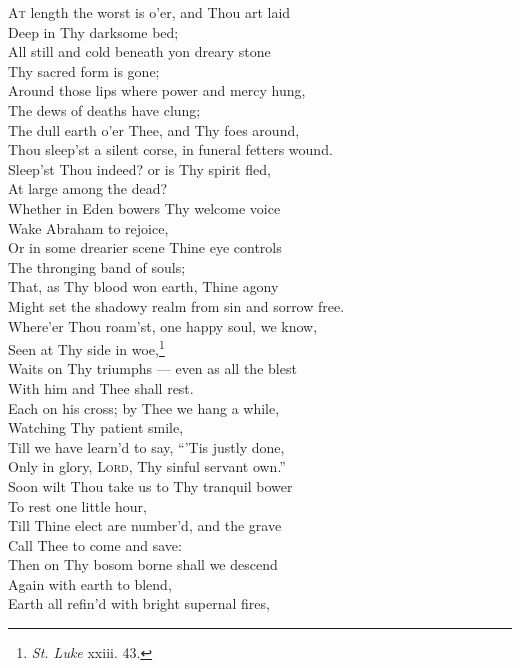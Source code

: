\textsc{At} length the worst is o’er, and Thou art laid \\
 Deep in Thy darksome bed; \\
 All still and cold beneath yon dreary stone \\
 Thy sacred form is gone; \\
 Around those lips where power and mercy hung, \\
 The dews of deaths have clung; \\
 The dull earth o’er Thee, and Thy foes around, \\
 Thou sleep’st a silent corse, in funeral fetters wound. \\
  Sleep’st Thou indeed? or is Thy spirit fled, \\
 At large among the dead? \\
 Whether in Eden bowers Thy welcome voice \\
 Wake Abraham to rejoice, \\
 Or in some drearier scene Thine eye controls \\
 The thronging band of souls; \\
 That, as Thy blood won earth, Thine agony \\
 Might set the shadowy realm from sin and sorrow free. \\
  Where’er Thou roam’st, one happy soul, we know, \\
 Seen at Thy side in woe,\footnote{\emph{St. Luke} xxiii. 43.} \\
 Waits on Thy triumphs — even as all the blest \\
 With him and Thee shall rest. \\
 Each on his cross; by Thee we hang a while, \\
 Watching Thy patient smile, \\
 Till we have learn’d to say, “’Tis justly done, \\
 Only in glory, \textsc{Lord}, Thy sinful servant own.” \\
  Soon wilt Thou take us to Thy tranquil bower \\
 To rest one little hour, \\
 Till Thine elect are number’d, and the grave \\
 Call Thee to come and save: \\
 Then on Thy bosom borne shall we descend \\
 Again with earth to blend, \\
 Earth all refin’d with bright supernal fires, \\
